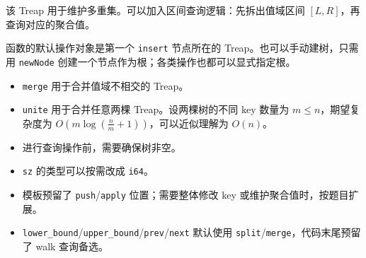 该 Treap 用于维护多重集。可以加入区间查询逻辑：先拆出值域区间 $[L,R]$，再查询对应的聚合值。

函数的默认操作对象是第一个 \texttt{insert} 节点所在的 Treap。也可以手动建树，只需用 \texttt{newNode} 创建一个节点作为根；各类操作也都可以显式指定根。

\begin{itemize}
  \item \texttt{merge} 用于合并值域不相交的 Treap。
  \item \texttt{unite} 用于合并任意两棵 Treap。设两棵树的不同 key 数量为 $m\le n$，期望复杂度为 $O\!\left(m\log\!\left(\frac{n}{m}+1\right)\right)$，可以近似理解为 $O(n)$。
  \item 进行查询操作前，需要确保树非空。
  \item \texttt{sz} 的类型可以按需改成 \texttt{i64}。
  \item 模板预留了 \texttt{push}/\texttt{apply} 位置；需要整体修改 key 或维护聚合值时，按题目扩展。
  \item \texttt{lower\_bound}/\texttt{upper\_bound}/\texttt{prev}/\texttt{next} 默认使用 \texttt{split}/\texttt{merge}，代码末尾预留了 walk 查询备选。
\end{itemize}
